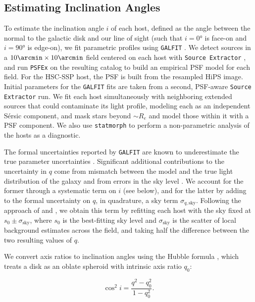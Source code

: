 \documentclass[apjl, linenumbers]{aastex701}
\begin{document}
\subsection{Estimating Inclination Angles} \label{sec:inclination}

To estimate the inclination angle $i$ of each host, defined as the angle between the normal to the galactic disk and our line of sight (such that $i = \ang{0}$ is face-on and $i = \ang{90}$ is edge-on), we fit parametric profiles using \texttt{GALFIT} \citep{Galfit, Galfit2}. We detect sources in a $10\arcmin \times 10\arcmin$ field centered on each host with \texttt{Source Extractor} \citep{SExtractor}, and run \texttt{PSFEx} \citep{PSFEx} on the resulting catalog to build an empirical PSF model for each field. For the HSC-SSP host, the PSF is built from the resampled HiPS image. Initial parameters for the \texttt{GALFIT} fits are taken from a second, PSF-aware \texttt{Source Extractor} run. We fit each host simultaneously with neighboring extended sources that could contaminate its light profile, modeling each as an independent S\'ersic component, and mask stars beyond $\sim R_e$ and model those within it with a PSF component. We also use \texttt{statmorph} \citep{Statmorph} to perform a non-parametric analysis of the hosts as a diagnostic.

The formal uncertainties reported by \texttt{GALFIT} are known to underestimate the true parameter uncertainties \citep{Haussler2007, Galfit2}. Significant additional contributions to the uncertainty in $q$ come from mismatch between the model and the true light distribution of the galaxy \citep{Galfit2} and from errors in the sky level \citep{Haussler2007, Gao2017}. We account for the former through a systematic term on $i$ (see below), and for the latter by adding to the formal uncertainty on $q$, in quadrature, a sky term $\sigma_{q,\mathrm{sky}}$. Following the approach of \citet{Huang2013} and \citet{Gao2017}, we obtain this term by refitting each host with the sky fixed at $s_0 \pm \sigma_{\mathrm{sky}}$, where $s_0$ is the best-fitting sky level and $\sigma_{\mathrm{sky}}$ is the scatter of local background estimates across the field, and taking half the difference between the two resulting values of $q$.

We convert axis ratios to inclination angles using the Hubble formula \citep{Hubble}, which treats a disk as an oblate spheroid with intrinsic axis ratio $q_0$:

\begin{equation} \label{eq:HubbleFormula}
\cos^2 i = \frac{q^2 - q_0^2}{1 - q_0^2}. 
\end{equation}
\end{document}
